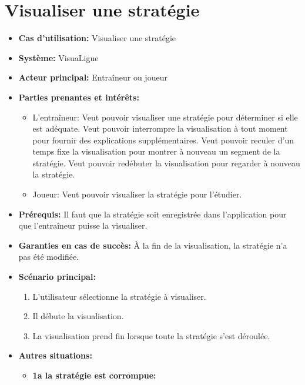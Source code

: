 \section{Visualiser une stratégie}
\label{sec:visualiser_une_strategie}
\begin{itemize}
    \item \textbf{Cas d'utilisation:} Visualiser une strat\'egie
    \item \textbf{Syst\`eme:} VisuaLigue
    \item \textbf{Acteur principal:} Entra\^ineur ou joueur
    \item \textbf{Parties prenantes et int\'er\^ets:}
        \begin{itemize}
            \item L'entra\^ineur: Veut pouvoir visualiser une strat\'egie pour d\'eterminer si elle est ad\'equate.
                Veut pouvoir interrompre la visualisation \`a tout moment pour fournir des explications suppl\'ementaires.
                Veut pouvoir reculer d'un temps fixe la visualisation pour montrer \`a nouveau un segment de la strat\'egie.
                Veut pouvoir red\'ebuter la visualisation pour regarder \`a nouveau la strat\'egie.
            \item Joueur: Veut pouvoir visualiser la strat\'egie pour l'\'etudier.
        \end{itemize}
    \item \textbf{Pr\'erequis:} Il faut que la strat\'egie soit enregistr\'ee dans l'application pour que l'entraîneur puisse la visualiser.
    \item \textbf{Garanties en cas de succ\`es:} \`A la fin de la visualisation, la strat\'egie n'a pas \'et\'e modifi\'ee.
    \item \textbf{Sc\'enario principal:}
        \begin{enumerate}
            \item L'utilisateur s\'electionne la strat\'egie \`a visualiser.
            \item Il d\'ebute la visualisation.
            \item La visualisation prend fin lorsque toute la strat\'egie s'est d\'eroul\'ee.
        \end{enumerate}
    \item \textbf{Autres situations:}
        \begin{itemize}
            \item \textbf{1a la strat\'egie est corrompue:}
                \begin{enumerate}

\end{enumerate}
\end{itemize}
\end{itemize}
